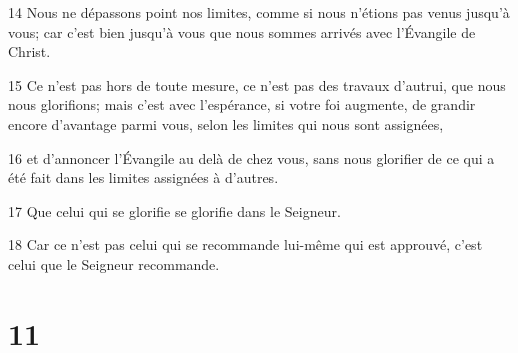 \par 14 Nous ne dépassons point nos limites, comme si nous n'étions pas venus jusqu'à vous; car c'est bien jusqu'à vous que nous sommes arrivés avec l'Évangile de Christ.
\par 15 Ce n'est pas hors de toute mesure, ce n'est pas des travaux d'autrui, que nous nous glorifions; mais c'est avec l'espérance, si votre foi augmente, de grandir encore d'avantage parmi vous, selon les limites qui nous sont assignées,
\par 16 et d'annoncer l'Évangile au delà de chez vous, sans nous glorifier de ce qui a été fait dans les limites assignées à d'autres.
\par 17 Que celui qui se glorifie se glorifie dans le Seigneur.
\par 18 Car ce n'est pas celui qui se recommande lui-même qui est approuvé, c'est celui que le Seigneur recommande.

\chapter{11}

